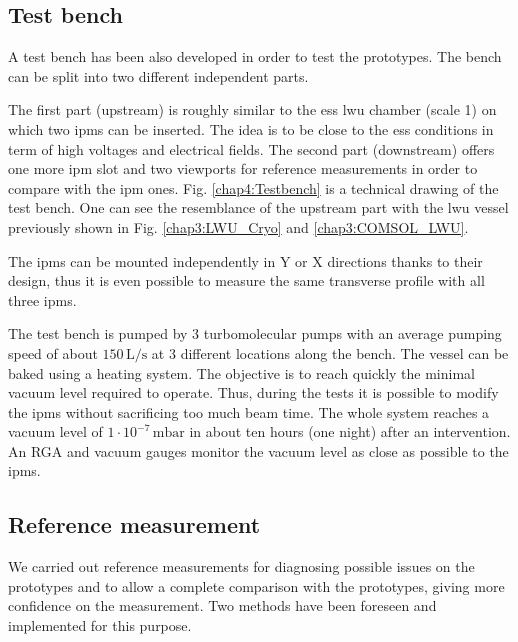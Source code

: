 \begin{refsection}

  

  \subsection{Test bench}
  A test bench has been also developed in order to test the prototypes. The bench can be split into two different independent parts.

  The first part (upstream) is roughly similar to the \acrshort{ess} \acrshort{lwu} chamber (scale 1) on which two \acrshort{ipm}s can be inserted. The idea is to be close to the \acrshort{ess} conditions in term of high voltages and electrical fields. The second part (downstream) offers one more \acrshort{ipm} slot and two viewports for reference measurements in order to compare with the \acrshort{ipm} ones. Fig. \ref{chap4:Testbench} is a technical drawing of the test bench. One can see the resemblance of the upstream part with the \acrshort{lwu} vessel previously shown in Fig. \ref{chap3:LWU_Cryo} and \ref{chap3:COMSOL_LWU}.


  The \acrshort{ipm}s can be mounted independently in Y or X directions thanks to their design, thus it is even possible to measure the same transverse profile with all three \acrshort{ipm}s.

  

  The test bench is pumped by 3 turbomolecular pumps with an average pumping speed of about $150\,\mathrm{L/s}$ at 3 different locations along the bench. The vessel can be baked using a heating system. The objective is to reach quickly the minimal vacuum level required to operate. Thus, during the tests it is possible to modify the \acrshort{ipm}s without sacrificing too much beam time. The whole system reaches a vacuum level of $1\cdot 10^{-7}\,\mathrm{mbar}$ in about ten hours (one night) after an intervention. An RGA and vacuum gauges monitor the vacuum level as close as possible to the \acrshort{ipm}s.

  \subsection{Reference measurement}
  \label{chap4:sec:ref}
  We carried out reference measurements for diagnosing possible issues on the prototypes and to allow a complete comparison with the prototypes, giving more confidence on the measurement. Two methods have been foreseen and implemented for this purpose.


\end{refsection}

